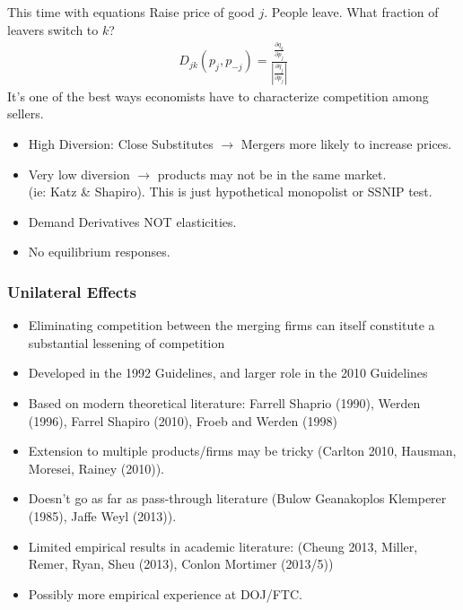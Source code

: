 \documentclass[xcolor=pdftex,dvipsnames,table,mathserif,aspectratio=169]{beamer}
\begin{document}
\begin{frame}{This time with equations}
 Raise price of good $j$. People leave. What fraction of leavers switch to $k$?
\begin{eqnarray*}
D_{jk} (p_j,p_{-j})= \frac{\frac{\partial q_k}{\partial p_j}}{\left|\frac{\partial q_j}{\partial p_j} \right|}
\end{eqnarray*}
It's one of the best ways economists have to characterize competition among sellers.
\begin{itemize}
\item High Diversion: Close Substitutes $\rightarrow$ Mergers more likely to increase prices.
\item Very low diversion $\rightarrow$ products may not be in the same market.\\ (ie: Katz \& Shapiro). This is just hypothetical monopolist or SSNIP test.
\item Demand Derivatives NOT elasticities.
\item No equilibrium responses.
\end{itemize}
\end{frame}

\begin{frame}
\frametitle{Unilateral Effects}
\begin{itemize}
\item Eliminating competition between the merging firms can itself constitute a substantial lessening of competition
\item Developed in the 1992 Guidelines, and larger role in the 2010 Guidelines
\item Based on modern theoretical literature: Farrell Shaprio (1990), Werden (1996), Farrel Shapiro (2010), Froeb and Werden (1998)
\item Extension to multiple products/firms may be tricky (Carlton 2010, Hausman, Moresei, Rainey (2010)).
\item Doesn't go as far as pass-through literature (Bulow Geanakoplos Klemperer (1985), Jaffe Weyl (2013)). 
\item Limited empirical results in academic literature: (Cheung 2013, Miller, Remer, Ryan, Sheu (2013), Conlon Mortimer (2013/5))
\item Possibly more empirical experience at DOJ/FTC.
\end{itemize} 
\end{frame}
\end{document}
